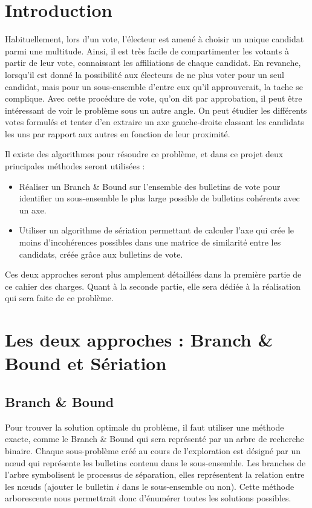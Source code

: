 \documentclass[12pt]{article}
\begin{document}
\section*{Introduction}
Habituellement, lors d'un vote, l'électeur est amené à choisir un unique candidat parmi une multitude. Ainsi, il est très facile de compartimenter les votants à partir de leur vote, connaissant les affiliations de chaque candidat. En revanche, lorsqu'il est donné la possibilité aux électeurs de ne plus voter pour un seul candidat, mais pour un sous-ensemble d'entre eux qu'il approuverait, la tache se complique. Avec cette procédure de vote, qu'on dit par approbation, il peut être intéressant de voir le problème sous un autre angle. On peut étudier les différents votes formulés et tenter d'en extraire un axe \og gauche-droite \fg{} classant les candidats les uns par rapport aux autres en fonction de leur proximité.

Il existe des algorithmes pour résoudre ce problème, et dans ce projet deux principales méthodes seront utilisées :
\begin{itemize}
	\item Réaliser un \og Branch \& Bound \fg{} sur l'ensemble des bulletins de vote pour identifier un sous-ensemble le plus large possible de bulletins cohérents avec un axe.
	\item Utiliser un algorithme de sériation permettant de calculer l'axe qui crée le moins d'incohérences possibles dans une matrice de similarité entre les candidats, créée grâce aux bulletins de vote.
\end{itemize}

Ces deux approches seront plus amplement détaillées dans la première partie de ce cahier des charges. Quant à la seconde partie, elle sera dédiée à la réalisation qui sera faite de ce problème.

\section{Les deux approches : Branch \& Bound et S\'{e}riation}


\subsection{Branch \& Bound}

Pour trouver la solution optimale du probl\`{e}me, il faut utiliser une m\'{e}thode exacte, comme le \og Branch \& Bound \fg{} qui sera repr\'{e}sent\'{e} par un arbre de recherche binaire. Chaque sous-probl\`{e}me cr\'{e}\'{e} au cours de l'exploration est d\'{e}sign\'{e} par un n\oe{}ud qui repr\'{e}sente les bulletins contenu dans le sous-ensemble. Les branches de l'arbre symbolisent le processus de s\'{e}paration, elles repr\'{e}sentent la relation entre les n\oe{}uds (ajouter le bulletin $i$ dans le sous-ensemble ou non). Cette m\'{e}thode arborescente nous permettrait donc d'\'{e}num\'{e}rer toutes les solutions possibles.
\end{document}
